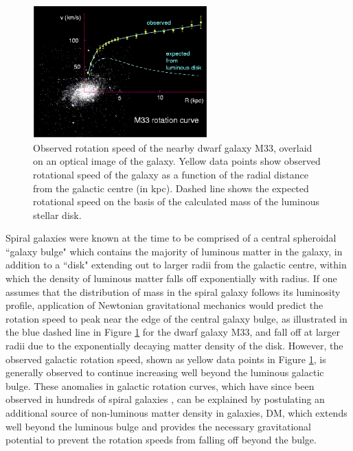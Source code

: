 \begin{figure}[H]
	\centering
	\includegraphics[width=0.6\textwidth]{Figures/1/m33_rotation.pdf}
	\caption[]{Observed rotation speed of the nearby dwarf galaxy M33, overlaid on an optical image of the galaxy. Yellow data points show observed rotational speed of the galaxy as a function of the radial distance from the galactic centre (in kpc). Dashed line shows the expected rotational speed on the basis of the calculated mass of the luminous stellar disk. }
	\label{fig:m33_rotation}
\end{figure}

Spiral galaxies were known at the time to be comprised of a central spheroidal ``galaxy bulge" which contains the majority of luminous matter in the galaxy, in addition to a ``disk" extending out to larger radii from the galactic centre, within which the density of luminous matter falls off exponentially with radius. If one assumes that the distribution of mass in the spiral galaxy follows its luminosity profile, application of Newtonian gravitational mechanics would predict the rotation speed to peak near the edge of the central galaxy bulge, as illustrated in the blue dashed line in Figure \ref{fig:m33_rotation} for the dwarf galaxy M33, and fall off at larger radii due to the exponentially decaying matter density of the disk. However, the observed galactic rotation speed, shown as yellow data points in Figure \ref{fig:m33_rotation}, is generally observed to continue increasing well beyond the luminous galactic bulge. These anomalies in galactic rotation curves, which have since been observed in hundreds of spiral galaxies \cite{rotn_curves_1995}, can be explained by postulating an additional source of non-luminous matter density in galaxies, DM, which extends well beyond the luminous bulge and provides the necessary gravitational potential to prevent the rotation speeds from falling off beyond the bulge.

